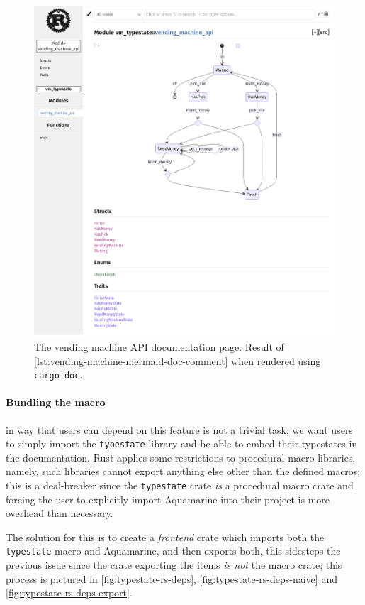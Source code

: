 \begin{figure}
    \centering
    \includegraphics[width=\textwidth]{Chapters/Figures/C4/vending-machine-rustdoc-mermaid.png}
    \caption{
        The vending machine \gls{API} documentation page.
        Result of \autoref{lst:vending-machine-mermaid-doc-comment} when rendered using \texttt{cargo doc}.
    }
    \label{fig:vending-machine-mermaid-docs}
\end{figure}

\paragraph{Bundling the macro} in way that users can depend on this feature is not a trivial task;
we want users to simply import the \texttt{typestate} library and be able to embed their typestates in the documentation.
Rust applies some restrictions to procedural macro libraries, namely,
such libraries cannot export anything else other than the defined macros;
this is a deal-breaker since the \texttt{typestate} crate \emph{is} a procedural macro crate and
forcing the user to explicitly import Aquamarine into their project is more overhead than necessary.

The solution for this is to create a \emph{frontend} crate which imports both the \texttt{typestate} macro and Aquamarine,
and then exports both, this sidesteps the previous issue since the crate exporting the items \emph{is not} the macro crate;
this process is pictured in \autoref{fig:typestate-rs-deps}, \autoref{fig:typestate-rs-deps-naive} and \autoref{fig:typestate-rs-deps-export}.

